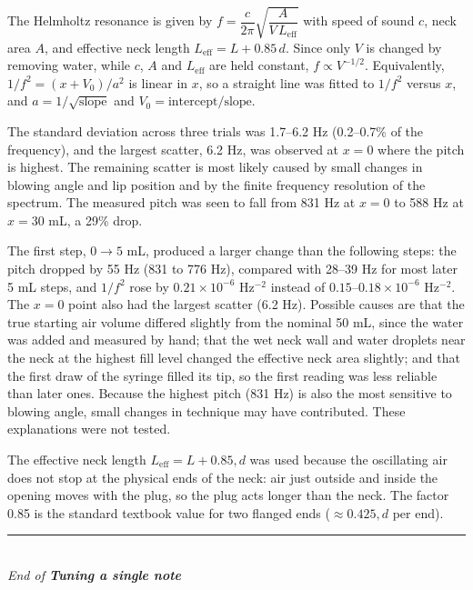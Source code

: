\documentclass[12pt]{article}
\newcommand{\hwTitle}{Tuning a single note}
\begin{document}
The Helmholtz resonance is given by $f = \dfrac{c}{2\pi}\sqrt{\dfrac{A}{V\,L_\mathrm{eff}}}$ with speed of sound $c$, neck area $A$, and effective neck length
$L_\mathrm{eff} = L + 0.85\,d$. Since only $V$ is changed by removing water, while $c$, $A$ and $L_\mathrm{eff}$ are held constant, $f \propto V^{-1/2}$. Equivalently, $1/f^2 = (x + V_0)/a^2$ is linear in $x$, so a straight line was fitted to $1/f^2$ versus $x$, and
$a = 1/\sqrt{\text{slope}}$ and $V_0 = \text{intercept}/\text{slope}$.

The standard deviation across three trials was 1.7--6.2 Hz (0.2--0.7\% of the frequency), and the largest scatter, 6.2 Hz, was observed at $x = 0$
where the pitch is highest. The remaining scatter is most likely caused by small changes in blowing angle and lip position and by the finite frequency resolution of the spectrum.
The measured pitch was seen to fall from 831 Hz at $x = 0$ to 588 Hz at $x = 30$ mL, a 29\% drop.

The first step, $0\to5$ mL, produced a larger change than the following steps: the pitch dropped by 55 Hz (831 to 776 Hz), compared with 28--39 Hz for most later 5 mL steps, and $1/f^2$ rose by $0.21\times10^{-6}$ Hz$^{-2}$ instead of $0.15$--$0.18\times10^{-6}$ Hz$^{-2}$. The $x=0$ point also had the largest scatter (6.2 Hz). Possible causes are that the true starting air volume differed slightly from the nominal 50 mL, since the water was added and measured by hand; that the wet neck wall and water droplets near the neck at the highest fill level changed the effective neck area slightly; and that the first draw of the syringe filled its tip, so the first reading was less reliable than later ones. Because the highest pitch (831 Hz) is also the most sensitive to blowing angle, small changes in technique may have contributed. These explanations were not tested.

The effective neck length $L_\mathrm{eff} = L + 0.85,d$ was used because the oscillating air does not stop at the physical ends of the neck: air just outside and inside the opening moves with the plug, so the plug acts longer than the neck. The factor 0.85 is the standard textbook value for two flanged ends ($\approx 0.425,d$ per end).



\vfill
\begin{center}
    \rule{0.5\linewidth}{0.5pt}\\
    \textit{End of \textbf{\hwTitle \space \hwNumber}}
\end{center}
\end{document}
